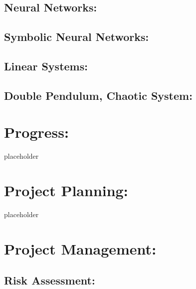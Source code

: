 \documentclass{article}
\begin{document}
\subsection{Neural Networks: }

\subsection{Symbolic Neural Networks: }

\subsection{Linear Systems: }

\subsection{Double Pendulum, Chaotic System: }

\section{Progress: }

placeholder 

\section{Project Planning: }

placeholder 

 

\section{ Project Management: }

\subsection{Risk Assessment: }
\end{document}
